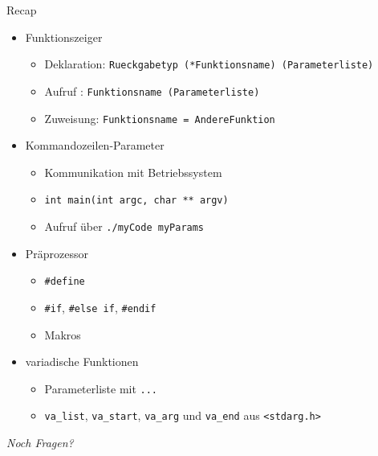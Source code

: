 
\begin{frame}[t,plain]
\titlepage
\end{frame}


\begin{frame}[fragile]{Recap}
%
\begin{itemize}
\item Funktionszeiger
	\begin{itemize}
	\item Deklaration:	\tabto{4cm}	\texttt{Rueckgabetyp (*Funktionsname) (Parameterliste)}
	\item Aufruf	:			\tabto{4cm}	\texttt{Funktionsname (Parameterliste)}
	\item Zuweisung:		\tabto{4cm}	\texttt{Funktionsname = AndereFunktion}
	\end{itemize}
\item Kommandozeilen-Parameter
	\begin{itemize}
	\item Kommunikation mit Betriebssystem
	\item \texttt{int main(int argc, char ** argv)}
	\item Aufruf über \texttt{./myCode myParams}
	\end{itemize}
\end{itemize}
%
\begin{minipage}{.49\linewidth}
\begin{itemize}
\item Präprozessor
	\begin{itemize}
	\item \texttt{#define}
	\item \texttt{#if}, \texttt{#else if}, \texttt{#endif}
	\item Makros
	\end{itemize}
\end{itemize}
\end{minipage}
%
%
\begin{minipage}{.49\linewidth}
\begin{itemize}
\item variadische Funktionen
	\begin{itemize}
	\item Parameterliste mit \texttt{...}
	\item \texttt{va\_list}, \texttt{va\_start}, \texttt{va\_arg} und \texttt{va\_end} aus \texttt{<stdarg.h>}
	\end{itemize}
\end{itemize}
\end{minipage}
%
\begin{center}
\emph{Noch Fragen?}
\end{center}

%
\end{frame}

